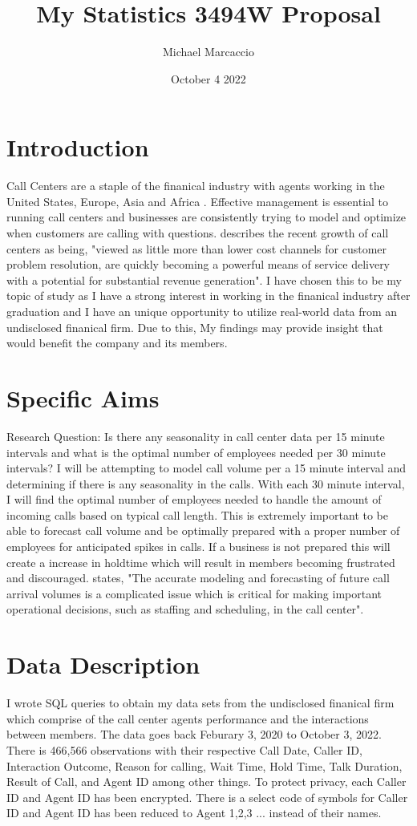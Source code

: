 \documentclass[12pt]{article}
\title{My Statistics 3494W Proposal}
\author{Michael  Marcaccio}
\date{October 4 2022}
\begin{document}
\maketitle

\section*{Introduction}
Call Centers are a staple of the finanical industry with agents working in the United States, Europe, Asia and Africa \citep{ibrahim2016modeling}. 
Effective management is essential to running call centers and businesses are consistently trying to model and optimize when customers are calling with questions. 
\citet*{evensen1999effective} describes the recent growth of call centers as being, "viewed as little more than lower cost channels for customer
problem resolution, are quickly becoming a powerful means of service delivery with a potential for substantial revenue generation".
I have chosen this to be my topic of study as I have a strong interest in working in the finanical industry after graduation and I have an unique opportunity to utilize real-world data from an undisclosed
finanical firm. Due to this, My findings may provide insight that would benefit the company and its members.

\section*{Specific Aims}
Research Question: Is there any seasonality in call center data per 15 minute intervals and what is the optimal number of employees needed per 30 minute intervals?
I will be attempting to model call volume per a 15 minute interval and determining if there is any seasonality in the calls. With each 30 minute interval,
I will find the optimal number of employees needed to handle the amount of incoming calls based on typical call length. This is extremely important
to be able to forecast call volume and be optimally prepared with a proper number of employees for anticipated spikes in calls. If a business is not prepared
this will create a increase in holdtime which will result in members becoming frustrated and discouraged. \citet*{ibrahim2016modeling} states, "The accurate modeling and forecasting of future call arrival volumes is a 
complicated issue which is critical for making important operational decisions, such as staffing and scheduling, in the call center".
    
\section*{Data Description}
I wrote SQL queries to obtain my data sets from the undisclosed finanical firm which comprise of the call center agents performance and the interactions between members. 
The data goes back Feburary 3, 2020 to October 3, 2022. There is 466,566 observations with their respective Call Date, Caller ID, Interaction Outcome,
Reason for calling, Wait Time, Hold Time, Talk Duration, Result of Call, and Agent ID among other things. To protect privacy, each Caller ID
and Agent ID has been encrypted. There is a select code of symbols for Caller ID and Agent ID has been reduced to Agent 1,2,3 ... instead of 
their names.
\end{document}

